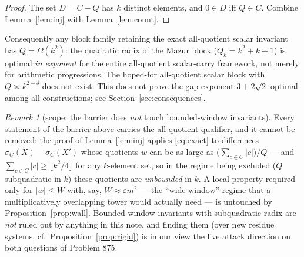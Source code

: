 \documentclass[11pt]{article}
\theoremstyle{definition}
\theoremstyle{remark}
\newtheorem{remark}[lemma]{Remark}
\begin{document}
\begin{proof}
The set $D=C-Q$ has $k$ distinct elements, and $0\in D$ iff $Q\in C$.
Combine Lemma~\ref{lem:inj} with Lemma~\ref{lem:count}.
\end{proof}

Consequently any block family retaining the exact all-quotient scalar
invariant has $Q=\Omega(k^2)$: the quadratic radix of the Mazur block
($Q_k=k^2+k+1$) is optimal \emph{in exponent} for the entire all-quotient
scalar-carry framework, not merely for arithmetic progressions. The
hoped-for all-quotient scalar block with $Q\asymp k^{2-\delta}$ does not
exist.
This does not prove the gap exponent $3+2\sqrt2$ optimal among all
constructions; see Section~\ref{sec:consequences}.

\begin{remark}[scope: the barrier does \emph{not} touch bounded-window
invariants]\label{rem:window-scope}
Every statement of the barrier above carries the all-quotient qualifier,
and it cannot be removed: the proof of Lemma~\ref{lem:inj} applies
\eqref{eq:exact} to differences $\sigma_C(X)-\sigma_C(X')$ whose
quotients $w$ can be as large as $\bigl(\sum_{c\in C}|c|\bigr)/Q$ --- and
$\sum_{c\in C}|c|\ge\lfloor k^2/4\rfloor$ for any $k$-element set, so in
the regime being excluded ($Q$ subquadratic in $k$) these quotients are
\emph{unbounded} in $k$. A local property required only for
$|w|\le W$ with, say, $W\approx\varepsilon m^2$ --- the ``wide-window''
regime that a multiplicatively overlapping tower would actually need ---
is untouched by Proposition~\ref{prop:wall}. Bounded-window invariants
with subquadratic radix are \emph{not} ruled out by anything in this
note, and finding them (over new residue systems, cf.\
Proposition~\ref{prop:rigid}) is in our view the live attack direction on
both questions of Problem 875.
\end{remark}
\end{document}
